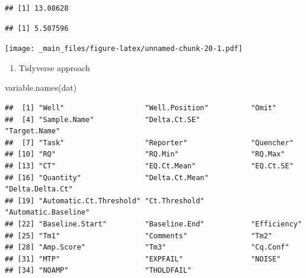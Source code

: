 \documentclass[
]{book}
\newenvironment{Shaded}{\begin{snugshade}}{\end{snugshade}}
\newcommand{\AttributeTok}[1]{\textcolor[rgb]{0.77,0.63,0.00}{#1}}
\newcommand{\ConstantTok}[1]{\textcolor[rgb]{0.00,0.00,0.00}{#1}}
\newcommand{\FunctionTok}[1]{\textcolor[rgb]{0.00,0.00,0.00}{#1}}
\newcommand{\NormalTok}[1]{#1}
\newcommand{\SpecialCharTok}[1]{\textcolor[rgb]{0.00,0.00,0.00}{#1}}
\providecommand{\tightlist}{%
  \setlength{\itemsep}{0pt}\setlength{\parskip}{0pt}}
\begin{document}
\begin{verbatim}
## [1] 13.08628
\end{verbatim}

\begin{Shaded}
\end{Shaded}

\begin{verbatim}
## [1] 5.507596
\end{verbatim}

\begin{Shaded}
\end{Shaded}

\texttt{[image: \_main\_files/figure-latex/unnamed-chunk-20-1.pdf]}

\begin{enumerate}
\def\labelenumi{\arabic{enumi}.}
\setcounter{enumi}{4}
\tightlist
\item
  Tidyverse approach
\end{enumerate}

\begin{Shaded}
\begin{Highlighting}[]
\FunctionTok{variable.names}\NormalTok{(dat)}
\end{Highlighting}
\end{Shaded}

\begin{verbatim}
##  [1] "Well"                   "Well.Position"          "Omit"                  
##  [4] "Sample.Name"            "Delta.Ct.SE"            "Target.Name"           
##  [7] "Task"                   "Reporter"               "Quencher"              
## [10] "RQ"                     "RQ.Min"                 "RQ.Max"                
## [13] "CT"                     "EQ.Ct.Mean"             "EQ.Ct.SE"              
## [16] "Quantity"               "Delta.Ct.Mean"          "Delta.Delta.Ct"        
## [19] "Automatic.Ct.Threshold" "Ct.Threshold"           "Automatic.Baseline"    
## [22] "Baseline.Start"         "Baseline.End"           "Efficiency"            
## [25] "Tm1"                    "Comments"               "Tm2"                   
## [28] "Amp.Score"              "Tm3"                    "Cq.Conf"               
## [31] "MTP"                    "EXPFAIL"                "NOISE"                 
## [34] "NOAMP"                  "THOLDFAIL"
\end{verbatim}
\end{document}
